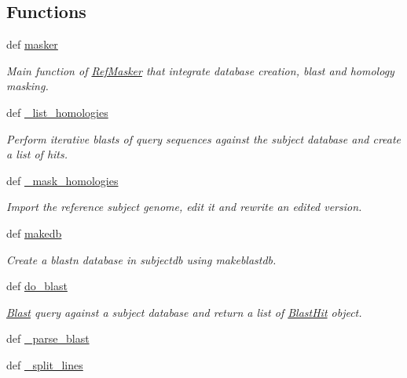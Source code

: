 \subsection*{Functions}
\begin{DoxyCompactItemize}
\item 
def \hyperlink{namespaceHomologyMasker_a9129003779af13581edac09232ab478c}{masker}
\begin{DoxyCompactList}\small\item\em Main function of \hyperlink{classHomologyMasker_1_1RefMasker}{Ref\-Masker} that integrate database creation, blast and homology masking. \end{DoxyCompactList}\item 
def \hyperlink{namespaceHomologyMasker_a5e2c3f4ec042e879106eb69a8ccff78a}{\-\_\-list\-\_\-homologies}
\begin{DoxyCompactList}\small\item\em Perform iterative blasts of query sequences against the subject database and create a list of hits. \end{DoxyCompactList}\item 
def \hyperlink{namespaceHomologyMasker_a0b05ea350cb75cb8a3e5678491ee8111}{\-\_\-mask\-\_\-homologies}
\begin{DoxyCompactList}\small\item\em Import the reference subject genome, edit it and rewrite an edited version. \end{DoxyCompactList}\item 
def \hyperlink{namespaceHomologyMasker_a7ac860f113bcd1f5179bb296401a0486}{makedb}
\begin{DoxyCompactList}\small\item\em Create a blastn database in subjectdb using makeblastdb. \end{DoxyCompactList}\item 
def \hyperlink{namespaceHomologyMasker_a248ff1fe5259a0e649cbe4fd5f90fe4c}{do\-\_\-blast}
\begin{DoxyCompactList}\small\item\em \hyperlink{classHomologyMasker_1_1Blast}{Blast} query against a subject database and return a list of \hyperlink{classHomologyMasker_1_1BlastHit}{Blast\-Hit} object. \end{DoxyCompactList}\item 
def \hyperlink{namespaceHomologyMasker_af1d8aba7696d25ad2f3053702c6ee6f2}{\-\_\-parse\-\_\-blast}
\item 
def \hyperlink{namespaceHomologyMasker_aa4d7fa9bb74deedda354a794bd261783}{\-\_\-split\-\_\-lines}

\end{DoxyCompactItemize}
